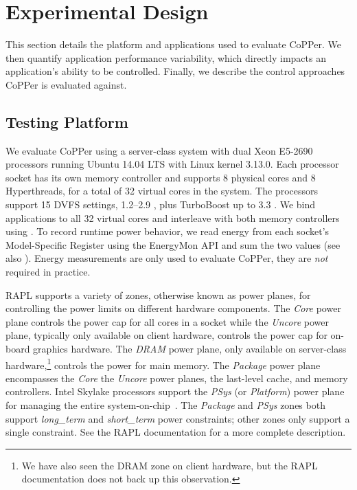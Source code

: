 \section{Experimental Design}
\label{sec:copper-usage}

This section details the platform and applications used to evaluate CoPPer.
We then quantify application performance variability, which directly impacts an application's ability to be controlled.
Finally, we describe the control approaches CoPPer is evaluated against.


\subsection{Testing Platform}

We evaluate CoPPer using a server-class system with dual Xeon E5-2690 processors running Ubuntu 14.04 LTS with Linux kernel 3.13.0.
Each processor socket has its own memory controller and supports 8 physical cores and 8 Hyperthreads, for a total of 32 virtual cores in the system.
The processors support 15 DVFS settings, 1.2--2.9 \GHz, plus TurboBoost up to 3.3 \GHz.
We bind applications to all 32 virtual cores and interleave with both memory controllers using .
To record runtime power behavior, we read energy from each socket's Model-Specific Register using the EnergyMon API and sum the two values \cite{energymon,SandyBridge} (see also ).
Energy measurements are only used to evaluate CoPPer, they are \emph{not} required in practice.

RAPL supports a variety of zones, otherwise known as power planes, for controlling the power limits on different hardware components.
The \emph{Core} power plane controls the power cap for all cores in a socket while the \emph{Uncore} power plane, typically only available on client hardware, controls the power cap for on-board graphics hardware.
The \emph{DRAM} power plane, only available on server-class hardware,\footnote{We have also seen the DRAM zone on client hardware, but the RAPL documentation does not back up this observation.} controls the power for main memory.
The \emph{Package} power plane encompasses the \emph{Core} the \emph{Uncore} power planes, the last-level cache, and memory controllers.
Intel Skylake processors support the \emph{PSys} (or \emph{Platform}) power plane for managing the entire system-on-chip~\cite{skylake}.
The \emph{Package} and \emph{PSys} zones both support \emph{long\_term} and \emph{short\_term} power constraints; other zones only support a single constraint.
See the RAPL documentation for a more complete description.

